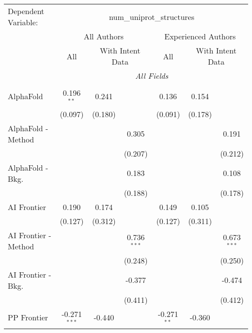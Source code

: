 \begingroup
\centering
\begin{tabular}{lcccccc}
   \tabularnewline \midrule \midrule
   Dependent Variable: & \multicolumn{6}{c}{num\_uniprot\_structures}\\
 & \multicolumn{3}{c}{All Authors} & \multicolumn{3}{c}{Experienced Authors} \\
\cmidrule(lr){2-4} \cmidrule(lr){5-7}
 & \multicolumn{1}{c}{All} & \multicolumn{2}{c}{With Intent Data} & \multicolumn{1}{c}{All} & \multicolumn{2}{c}{With Intent Data} \\
\cmidrule(lr){2-2} \cmidrule(lr){3-4} \cmidrule(lr){5-5} \cmidrule(lr){6-7}
 & \multicolumn{6}{c}{\textit{All Fields}} \\ \\
   AlphaFold            & 0.196$^{**}$   & 0.241   &               & 0.136         & 0.154   &   \\   
                        & (0.097)        & (0.180) &               & (0.091)       & (0.178) &   \\   
   AlphaFold - Method   &                &         & 0.305         &               &         & 0.191\\   
                        &                &         & (0.207)       &               &         & (0.212)\\   
   AlphaFold - Bkg.     &                &         & 0.183         &               &         & 0.108\\   
                        &                &         & (0.188)       &               &         & (0.178)\\   
   AI Frontier          & 0.190          & 0.174   &               & 0.149         & 0.105   &   \\   
                        & (0.127)        & (0.312) &               & (0.127)       & (0.311) &   \\   
   AI Frontier - Method &                &         & 0.736$^{***}$ &               &         & 0.673$^{***}$\\   
                        &                &         & (0.248)       &               &         & (0.250)\\   
   AI Frontier - Bkg.   &                &         & -0.377        &               &         & -0.474\\   
                        &                &         & (0.411)       &               &         & (0.412)\\   
   PP Frontier          & -0.271$^{***}$ & -0.440  &               & -0.271$^{**}$ & -0.360  &   \\   

\end{tabular}
